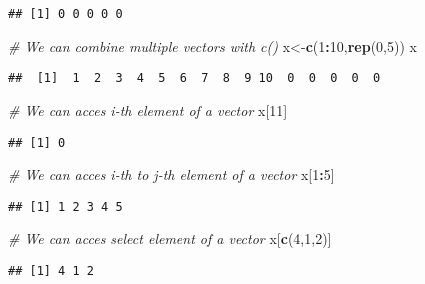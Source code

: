 \documentclass[
]{article}
\newenvironment{Shaded}{\begin{snugshade}}{\end{snugshade}}
\newcommand{\CommentTok}[1]{\textcolor[rgb]{0.56,0.35,0.01}{\textit{#1}}}
\newcommand{\DecValTok}[1]{\textcolor[rgb]{0.00,0.00,0.81}{#1}}
\newcommand{\FunctionTok}[1]{\textcolor[rgb]{0.13,0.29,0.53}{\textbf{#1}}}
\newcommand{\NormalTok}[1]{#1}
\newcommand{\OtherTok}[1]{\textcolor[rgb]{0.56,0.35,0.01}{#1}}
\newcommand{\SpecialCharTok}[1]{\textcolor[rgb]{0.81,0.36,0.00}{\textbf{#1}}}
\begin{document}
\begin{verbatim}
## [1] 0 0 0 0 0
\end{verbatim}

\begin{Shaded}
\begin{Highlighting}[]
\CommentTok{\# We can combine multiple vectors with c()}
\NormalTok{x}\OtherTok{\textless{}{-}}\FunctionTok{c}\NormalTok{(}\DecValTok{1}\SpecialCharTok{:}\DecValTok{10}\NormalTok{,}\FunctionTok{rep}\NormalTok{(}\DecValTok{0}\NormalTok{,}\DecValTok{5}\NormalTok{))}
\NormalTok{x}
\end{Highlighting}
\end{Shaded}

\begin{verbatim}
##  [1]  1  2  3  4  5  6  7  8  9 10  0  0  0  0  0
\end{verbatim}

\begin{Shaded}
\begin{Highlighting}[]
\CommentTok{\# We can acces i{-}th element of a vector}
\NormalTok{x[}\DecValTok{11}\NormalTok{]}
\end{Highlighting}
\end{Shaded}

\begin{verbatim}
## [1] 0
\end{verbatim}

\begin{Shaded}
\begin{Highlighting}[]
\CommentTok{\# We can acces i{-}th to j{-}th element of a vector}
\NormalTok{x[}\DecValTok{1}\SpecialCharTok{:}\DecValTok{5}\NormalTok{]}
\end{Highlighting}
\end{Shaded}

\begin{verbatim}
## [1] 1 2 3 4 5
\end{verbatim}

\begin{Shaded}
\begin{Highlighting}[]
\CommentTok{\# We can acces select element of a vector}
\NormalTok{x[}\FunctionTok{c}\NormalTok{(}\DecValTok{4}\NormalTok{,}\DecValTok{1}\NormalTok{,}\DecValTok{2}\NormalTok{)]}
\end{Highlighting}
\end{Shaded}

\begin{verbatim}
## [1] 4 1 2
\end{verbatim}
\end{document}
